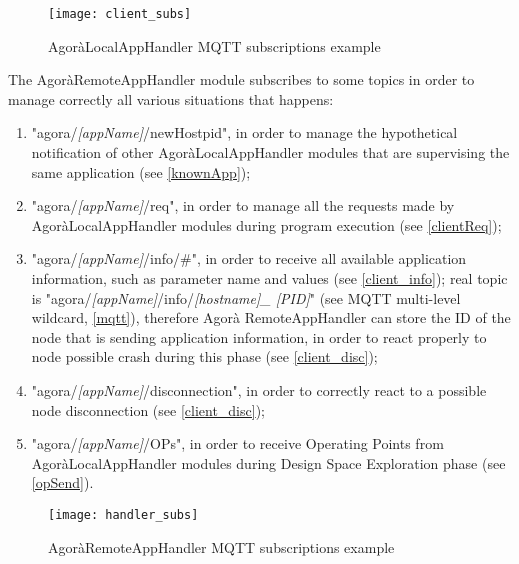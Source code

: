 \begin{figure}[H]

    \centering
    \texttt{[image: client\_subs]}
    \caption{AgoràLocalAppHandler MQTT subscriptions example}
    
\end{figure}

The AgoràRemoteAppHandler module subscribes to some topics in order to manage correctly all various situations that happens:

\begin{enumerate}

    \item "agora/\textit{[appName]}/newHostpid", in order to manage the hypothetical notification of other AgoràLocalAppHandler modules that are supervising the same application (see \ref{knownApp});
    
    \item "agora/\textit{[appName]}/req", in order to manage all the requests made by AgoràLocalAppHandler modules during program execution (see \ref{clientReq});
    
    \item "agora/\textit{[appName]}/info/\#", in order to receive all available application information, such as parameter name and values (see \ref{client_info}); real topic is "agora\slash{}\textit{[appName]}\slash{}info\slash{}\textit{[host\-name]\_ [PID]}" (see MQTT multi-level wildcard, \ref{mqtt}), therefore Agorà\-	Remote\-App\-Handler can store the ID of the node that is sending application information, in order to react properly to node possible crash during this phase (see \ref{client_disc});
    
    \item "agora/\textit{[appName]}/disconnection", in order to correctly react to a possible node disconnection (see \ref{client_disc});
    
    \item "agora/\textit{[appName]}/OPs", in order to receive Operating Points from AgoràLocalAppHandler modules during Design Space Exploration phase (see \ref{opSend}).

\end{enumerate}

\begin{figure}[H]

    \centering
    \texttt{[image: handler\_subs]}
    \caption{AgoràRemoteAppHandler MQTT subscriptions example}
    
\end{figure}


